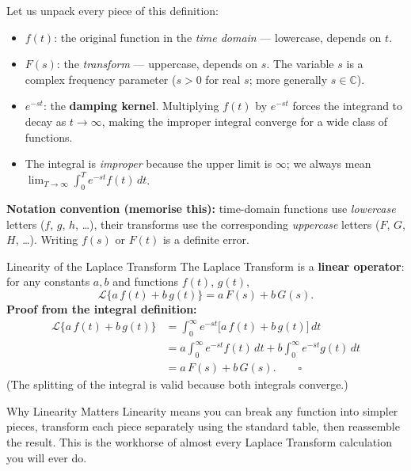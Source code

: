 \documentclass[12pt,a4paper]{article}
\begin{document}
\noindent Let us unpack every piece of this definition:

\begin{itemize}[leftmargin=1.5em]
  \item $f(t)$: the original function in the \emph{time domain} --- lowercase, depends on $t$.
  \item $F(s)$: the \emph{transform} --- uppercase, depends on $s$. The variable $s$ is a complex frequency parameter ($s > 0$ for real $s$; more generally $s \in \mathbb{C}$).
  \item $e^{-st}$: the \textbf{damping kernel}. Multiplying $f(t)$ by $e^{-st}$ forces the integrand to decay as $t \to \infty$, making the improper integral converge for a wide class of functions.
  \item The integral is \emph{improper} because the upper limit is $\infty$; we always mean $\lim_{T\to\infty}\int_0^T e^{-st}f(t)\,dt$.
\end{itemize}

\medskip

\textbf{Notation convention (memorise this):} time-domain functions use \emph{lowercase} letters ($f$, $g$, $h$, \ldots), their transforms use the corresponding \emph{uppercase} letters ($F$, $G$, $H$, \ldots). Writing $f(s)$ or $F(t)$ is a definite error.

\medskip

\begin{infobox}{Linearity of the Laplace Transform}
The Laplace Transform is a \textbf{linear operator}: for any constants $a, b$ and functions $f(t)$, $g(t)$,
\[
\mathcal{L}\{a\,f(t) + b\,g(t)\} = a\,F(s) + b\,G(s).
\]
\textbf{Proof from the integral definition:}
\begin{align*}
\mathcal{L}\{a\,f(t) + b\,g(t)\}
  &= \int_0^{\infty} e^{-st}\bigl[a\,f(t) + b\,g(t)\bigr]\,dt \\
  &= a\int_0^{\infty} e^{-st}f(t)\,dt + b\int_0^{\infty} e^{-st}g(t)\,dt \\
  &= a\,F(s) + b\,G(s). \qquad \square
\end{align*}
(The splitting of the integral is valid because both integrals converge.)
\end{infobox}

\begin{learnbox}{Why Linearity Matters}
Linearity means you can break any function into simpler pieces, transform each piece separately using the standard table, then reassemble the result. This is the workhorse of almost every Laplace Transform calculation you will ever do.
\end{learnbox}
\end{document}
